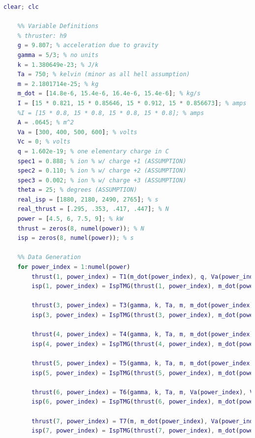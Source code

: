 \documentclass[letterpaper, 10 pt, conference]{ieeeconf}  %
\begin{document}
\begin{lstlisting}[language=Matlab]
    clear; clc
    
    %% Variable Definitions
    % thruster: h9
    g = 9.807; % acceleration due to gravity
    gamma = 5/3; % no units
    k = 1.380649e-23; % J/k
    Ta = 750; % kelvin (minor as all hell assumption)
    m = 2.1801714e-25; % kg
    m_dot = [14.8e-6, 15.4e-6, 16.4e-6, 15.4e-6]; % kg/s
    I = [15 * 0.821, 15 * 0.85646, 15 * 0.912, 15 * 0.856673]; % amps
    %I = [15 * 0.8, 15 * 0.8, 15 * 0.8, 15 * 0.8]; % amps
    A = .0645; % m^2
    Va = [300, 400, 500, 600]; % volts
    Vc = 0; % volts
    q = 1.602e-19; % one elementary charge in C
    spec1 = 0.888; % ion % w/ charge +1 (ASSUMPTION)
    spec2 = 0.110; % ion % w/ charge +2 (ASSUMPTION)
    spec3 = 0.002; % ion % w/ charge +3 (ASSUMPTION)
    theta = 25; % degrees (ASSUMPTION)
    real_isp = [1880, 2180, 2490, 2765]; % s
    real_thrust = [.295, .353, .417, .447]; % N
    power = [4.5, 6, 7.5, 9]; % kW
    thrust = zeros(8, numel(power)); % N
    isp = zeros(8, numel(power)); % s
    
    %% Data Generation
    for power_index = 1:numel(power)
        thrust(1, power_index) = T1(m_dot(power_index), q, Va(power_index), Vc, m);
        isp(1, power_index) = IspTMG(thrust(1, power_index), m_dot(power_index), g);
    
        thrust(3, power_index) = T3(gamma, k, Ta, m, m_dot(power_index), Va(power_index), Vc, q, I(power_index));
        isp(3, power_index) = IspTMG(thrust(3, power_index), m_dot(power_index), g);
    
        thrust(4, power_index) = T4(gamma, k, Ta, m, m_dot(power_index), Va(power_index), Vc, q, I(power_index), spec1, spec2, spec3);
        isp(4, power_index) = IspTMG(thrust(4, power_index), m_dot(power_index), g);
    
        thrust(5, power_index) = T5(gamma, k, Ta, m, m_dot(power_index), Va(power_index), Vc, q, I(power_index), spec1, spec2, spec3, theta);
        isp(5, power_index) = IspTMG(thrust(5, power_index), m_dot(power_index), g) * cosd(theta);
    
        thrust(6, power_index) = T6(gamma, k, Ta, m, Va(power_index), Vc, q, I(power_index), spec1, spec2, spec3, theta);
        isp(6, power_index) = IspTMG(thrust(6, power_index), m_dot(power_index), g) * cosd(theta);
        
        thrust(7, power_index) = T7(m, m_dot(power_index), Va(power_index), Vc, q, spec1, spec2, spec3, theta);
        isp(7, power_index) = IspTMG(thrust(7, power_index), m_dot(power_index), g) * cosd(theta);
    

\end{lstlisting}
\end{document}

